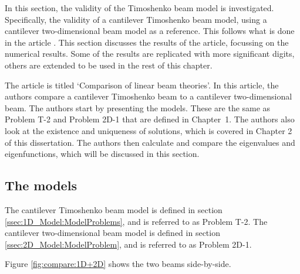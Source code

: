 	In this section, the validity of the Timoshenko beam model is investigated. Specifically, the validity of a cantilever Timoshenko beam model, using a cantilever two-dimensional beam model as a reference. This follows what is done in the article \cite{LVV09}. This section discusses the results of the article, focussing on the numerical results. Some of the results are replicated with more significant digits, others are extended to be used in the rest of this chapter.

	The article \cite{LVV09} is titled `Comparison of linear beam theories'. In this article, the authors compare a cantilever Timoshenko beam to a cantilever two-dimensional beam. The authors start by presenting the models. These are the same as Problem T-2 and Problem 2D-1 that are defined in Chapter~1. The authors also look at the existence and uniqueness of solutions, which is covered in Chapter 2 of this dissertation. The authors then calculate and compare the eigenvalues and eigenfunctions, which will be discussed in this section.

	\subsection{The models}
	The cantilever Timoshenko beam model is defined in section \ref{ssec:1D_Model:ModelProblems}, and is referred to as Problem T-2. The cantilever two-dimensional beam model is defined in section \ref{ssec:2D_Model:ModelProblem}, and is referred to as Problem 2D-1.

	Figure \ref{fig:compare:1D+2D} shows the two beams side-by-side.

